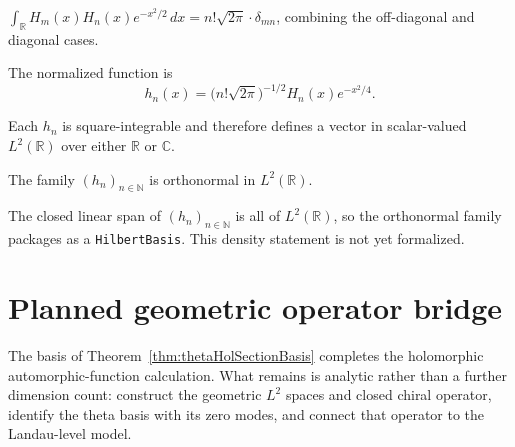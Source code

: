 \begin{theorem}
  \label{thm:hermite-orthogonality}
  \leanok
  $\int_{\mathbb{R}} H_m(x) H_n(x) e^{-x^2/2}\,dx = n! \sqrt{2\pi} \cdot \delta_{mn}$, combining
  the off-diagonal and diagonal cases.
\end{theorem}

\begin{definition}
  \label{def:hermiteFunction}
  \leanok
  The normalized function is
  \[
    h_n(x)=\bigl(n!\sqrt{2\pi}\bigr)^{-1/2}H_n(x)e^{-x^2/4}.
  \]
\end{definition}

\begin{definition}
  \label{def:hermiteFunctionL2}
  \leanok
  Each $h_n$ is square-integrable and therefore defines a vector in scalar-valued
  $L^2(\mathbb R)$ over either $\mathbb R$ or $\mathbb C$.
\end{definition}

\begin{theorem}
  \label{thm:orthonormal-hermiteFunctionL2}
  \leanok
  The family $(h_n)_{n\in\mathbb N}$ is orthonormal in $L^2(\mathbb R)$.
\end{theorem}

\begin{theorem}
  \label{thm:hermite-completeness}
  The closed linear span of $(h_n)_{n\in\mathbb N}$ is all of $L^2(\mathbb R)$, so the
  orthonormal family packages as a \texttt{HilbertBasis}.  This density statement is not yet
  formalized.
\end{theorem}

\section{Planned geometric operator bridge}
\label{sec:planned-operator-bridge}

The basis of Theorem~\ref{thm:thetaHolSectionBasis} completes the holomorphic
automorphic-function calculation.  What remains is analytic rather than a further dimension
count: construct the geometric $L^2$ spaces and closed chiral operator, identify the theta
basis with its zero modes, and connect that operator to the Landau-level model.

